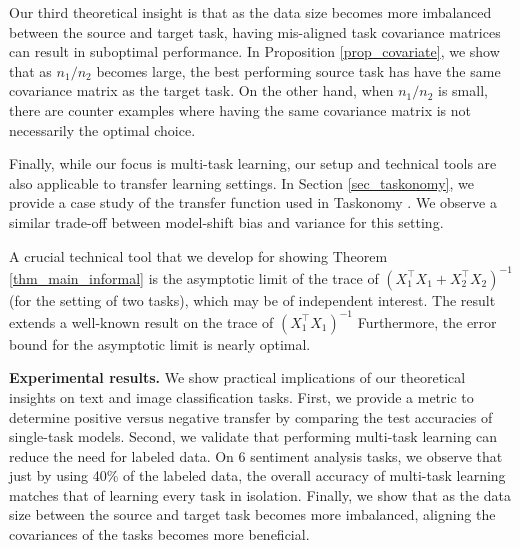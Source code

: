 Our third theoretical insight is that as the data size becomes more imbalanced between the source and target task, having mis-aligned task covariance matrices can result in suboptimal performance.
	In Proposition \ref{prop_covariate}, we show that as $n_1 / n_2$ becomes large, the best performing source task has have the same covariance matrix as the target task.
	On the other hand, when $n_1 / n_2$ is small, there are counter examples where having the same covariance matrix is not necessarily the optimal choice.


Finally, while our focus is multi-task learning, our setup and technical tools are also applicable to transfer learning settings.
In Section \ref{sec_taskonomy}, we provide a case study of the transfer function used in Taskonomy \cite{ZSSGM18}.
We observe a similar trade-off between model-shift bias and variance for this setting.

A crucial technical tool that we develop for showing Theorem \ref{thm_main_informal} is the asymptotic limit of the trace of $(X_1^{\top}X_1 + X_2^{\top}X_2)^{-1}$ (for the setting of two tasks), which may be of independent interest.
The result extends a well-known result on the trace of $(X_1^{\top}X_1)^{-1}$ \cite{S07}
Furthermore, the error bound for the asymptotic limit is nearly optimal.

\textbf{Experimental results.} We show practical implications of our theoretical insights on text and image classification tasks.
	First, we provide a metric to determine positive versus negative transfer by comparing the test accuracies of single-task models.
	Second, we validate that performing multi-task learning can reduce the need for labeled data.
	On 6 sentiment analysis tasks, we observe that just by using \alert{40\%} of the labeled data, the overall accuracy of multi-task learning matches that of learning every task in isolation.
	Finally, we show that as the data size between the source and target task becomes more imbalanced, aligning the covariances of the tasks becomes more beneficial.


